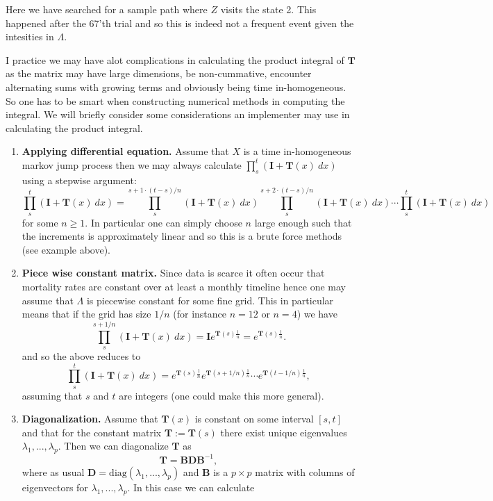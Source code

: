 \documentclass[a4paper,10pt,openany]{book}
\providecommand{\tightlist}{%
 \setlength{\itemsep}{0pt}\setlength{\parskip}{0pt}}
\begin{document}
Here we have searched for a sample path where \(Z\) visits the state 2. This happened after the 67'th trial and so this is indeed not a frequent event given the intesities in \(\Lambda\).

I practice we may have alot complications in calculating the product integral of \(\mathbf T\) as the matrix may have large dimensions, be non-cummative, encounter alternating sums with growing terms and obviously being time in-homogeneous. So one has to be smart when constructing numerical methods in computing the integral. We will briefly consider some considerations an implementer may use in calculating the product integral.

\begin{enumerate}
\def\labelenumi{\arabic{enumi}.}
\tightlist
\item
  \textbf{Applying differential equation.} Assume that \(X\) is a time in-homogeneous markov jump process then we may always calculate \(\prod_s^t(\mathbf I + \mathbf T(x)\ dx)\) using a stepwise argument:
  \[
    \prod_s^t(\mathbf I + \mathbf T(x)\ dx)=\prod_s^{s+1\cdot (t-s)/n}(\mathbf I + \mathbf T(x)\ dx)\prod_s^{s+2\cdot (t-s)/n}(\mathbf I + \mathbf T(x)\ dx)\cdots\prod_s^{t}(\mathbf I + \mathbf T(x)\ dx)
    \]
  for some \(n\ge 1\). In particular one can simply choose \(n\) large enough such that the increments is approximately linear and so this is a brute force methods (see example above).
\item
  \textbf{Piece wise constant matrix.} Since data is scarce it often occur that mortality rates are constant over at least a monthly timeline hence one may assume that \(\Lambda\) is piecewise constant for some fine grid. This in particular means that if the grid has size \(1/n\) (for instance \(n=12\) or \(n=4\)) we have
  \[
    \prod_s^{s+1/n}(\mathbf I + \mathbf T(x)\ dx)=\mathbf{I}e^{\mathbf{T}(s)\frac{1}{n}}=e^{\mathbf{T}(s)\frac{1}{n}}.
    \]
  and so the above reduces to
  \[
    \prod_s^t(\mathbf I + \mathbf T(x)\ dx)=e^{\mathbf{T}(s)\frac{1}{n}}e^{\mathbf{T}(s+1/n)\frac{1}{n}}\cdots e^{\mathbf{T}(t-1/n)\frac{1}{n}},
    \]
  assuming that \(s\) and \(t\) are integers (one could make this more general).
\item
  \textbf{Diagonalization.} Assume that \(\mathbf{T}(x)\) is constant on some interval \([s,t]\) and that for the constant matrix \(\mathbf{T}:=\mathbf{T}(s)\) there exist unique eigenvalues \(\lambda_1,...,\lambda_p\). Then we can diagonalize \(\mathbf{T}\) as
  \[
    \mathbf{T}=\mathbf{B}\mathbf{D}\mathbf{B}^{-1},
    \]
  where as usual \(\mathbf{D}=\text{diag}(\lambda_1,...,\lambda_p)\) and \(\mathbf{B}\) is a \(p\times p\) matrix with columns of eigenvectors for \(\lambda_1,...,\lambda_p\). In this case we can calculate

\end{enumerate}
\end{document}

